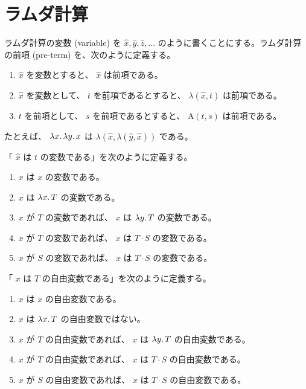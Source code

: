 \documentclass[book]{jlreq}
\newcommand{\p}[1]{ \mathord{ \left( #1 \right) } }
\begin{document}
\section{ラムダ計算}

ラムダ計算の変数 (variable) を \( \hat{x}, \hat{y}, \hat{z}, \ldots \) のように書くことにする。ラムダ計算の前項 (pre-term) を、次のように定義する。

\begin{enumerate}
    \item \( \hat{x} \) を変数とすると、 \( \hat{x} \) は前項である。
    \item \( \hat{x} \) を変数として、 \( t \) を前項であるとすると、 \( \lambda \p{ \hat{x}, t } \) は前項である。
    \item \( t \) を前項として、 \( s \) を前項であるとすると、 \( \mathrm{A} \p{ t, s } \) は前項である。
\end{enumerate}

たとえば、 \( \lambda x \ldotp \lambda y \ldotp x \) は \( \lambda \p{ \hat{x}, \lambda \p{ \hat{y}, \hat{x} } } \) である。

「 \( \hat{x} \) は \( t \) の変数である」を次のように定義する。

\begin{enumerate}
    \item \( x \) は \( x \) の変数である。
    \item \( x \) は \( \lambda x \ldotp T \) の変数である。
    \item \( x \) が \( T \) の変数であれば、 \( x \) は \( \lambda y \ldotp T \) の変数である。
    \item \( x \) が \( T \) の変数であれば、 \( x \) は \( T \cdot S \) の変数である。
    \item \( x \) が \( S \) の変数であれば、 \( x \) は \( T \cdot S \) の変数である。
\end{enumerate}

「 \( x \) は \( T \) の自由変数である」を次のように定義する。

\begin{enumerate}
    \item \( x \) は \( x \) の自由変数である。
    \item \( x \) は \( \lambda x \ldotp T \) の自由変数ではない。
    \item \( x \) が \( T \) の自由変数であれば、 \( x \) は \( \lambda y \ldotp T \) の自由変数である。
    \item \( x \) が \( T \) の自由変数であれば、 \( x \) は \( T \cdot S \) の自由変数である。
    \item \( x \) が \( S \) の自由変数であれば、 \( x \) は \( T \cdot S \) の自由変数である。
\end{enumerate}
\end{document}
